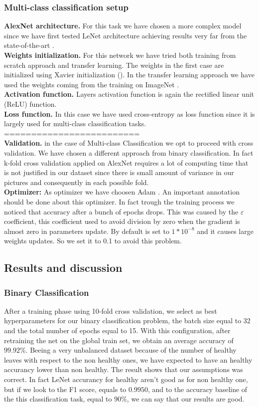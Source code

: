 \subsubsection{Multi-class classification setup}
\textbf{AlexNet architecture.}
For this task we have chosen a more complex model since we have first tested LeNet architecture achieving results very far from the state-of-the-art \cite{ref11}.
\\
\textbf{Weights initialization.}
For this network we have tried both training from scratch approach and transfer learning. The weights in the first case are initialized using Xavier initialization (\cite{ref31}). In the transfer learning approach we have used the weights coming from the training on ImageNet \cite{imagenet}.
\\
\textbf{Activation function.}
Layers activation function is again the rectified linear unit (ReLU) function.
\\
\textbf{Loss function.}
In this case we have used cross-entropy as loss function since it is largely used for multi-class classification tasks.
=========================
\\
\textbf{Validation.}
in the case of Multi-class Classification we opt to proceed with cross validation. We have chosen a different approach from binary classification. In fact k-fold cross validation applied on AlexNet requires a lot of computing time that is not justified in our dataset since there is small amount of variance in our pictures and consequently in each possible fold.
\\
\textbf{Optimizer:}
As optimizer we have choosen Adam \cite{ref32}. An important annotation should be done about this optimizer. In fact trough the training process we noticed that accuracy after a bunch of epochs drops. This was caused by the $\varepsilon$ coefficient, this coefficient used to avoid division by zero when the gradient is almost zero in parameters update.  By default is set to $1*10^{-8}$ and it causes large weights updates. So we set it to 0.1 to avoid this problem.



\subsection{Results and discussion}
\subsubsection{Binary Classification}
After a training phase using 10-fold cross validation, we select as best hyperparameters for our binary classification problem, the batch size equal to 32 and the total number of epochs equal to 15. With this configuration, after retraining the net on the global train set, we obtain an average accuracy of $99.92\%$. Beeing a very unbalanced dataset because of the number of healthy leaves with respect to the non healthy ones, we have expected to have an healthy accurancy lower than non healthy. The result shows that our assumptions was correct. In fact LeNet accurancy for healthy aren't good as for non healthy one, but if we look to the F1 score, equals to $0.9950$, and to the accuracy baseline of the this classification task, equal to $90\%$, we can say that our results are good.
